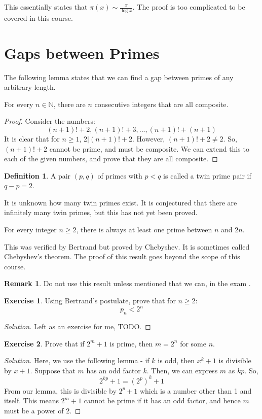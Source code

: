 \documentclass[12pt,letterpaper]{amsbook}
\theoremstyle{definition}
\newtheorem{definition}{Definition} %
\newtheorem*{remark}{Remark}
\newtheorem*{exercise}{Exercise}
\newenvironment{solution}
  {\renewcommand\qedsymbol{$\blacksquare$}\begin{proof}[Solution]}
  {\end{proof}}
\newcommand{\N}{\mathbb{N}}
\begin{document}
This essentially states that $\pi (x) \sim \frac{x}{\log{x}}$. The proof is too complicated to be covered in this course.

\section{Gaps between Primes}

The following lemma states that we can find a gap between primes of any arbitrary length.

\begin{lemma}
  For every $n \in \N$, there are $n$ consecutive integers that are all composite.  
\end{lemma}

\begin{proof}
  Consider the numbers:
  \[(n+1)! + 2, (n+1)! + 3, ... ,(n+1)!+(n+1)\]
  It is clear that for $n \geq 1$, $2|(n+1)!+2$. However, $(n+1)! + 2 \neq 2$. So, $(n+1)!+2$ cannot be prime, and must be composite. We can extend this to each of the given numbers, and prove that they are all composite.
\end{proof}

\begin{definition}
  A pair $(p,q)$ of primes with $p < q$ is called a twin prime pair if $q-p = 2$.  
\end{definition}

It is unknown how many twin primes exist. It is conjectured that there are infinitely many twin primes, but this has not yet been proved.

\begin{theorem}
  For every integer $n \geq 2$, there is always at least one prime between $n$ and $2n$.  
\end{theorem}

This was verified by Bertrand but proved by Chebyshev. It is sometimes called Chebyshev's theorem. The proof of this result goes beyond the scope of this course.

\begin{remark}
  Do not use this result unless mentioned that we can, in the exam .
\end{remark}

\begin{exercise}
  Using Bertrand's postulate, prove that for $n \geq 2$:
  \[p_n < 2^n\]
\end{exercise}

\begin{solution}
  Left as an exercise for me, TODO.
\end{solution}
\begin{exercise}
  Prove that if $2^{m}+1$ is prime, then $m = 2^n$ for some $n$.
\end{exercise}
\begin{solution}
  Here, we use the following lemma - if $k$ is odd, then $x^k+1$ is divisible by $x+1$.
  Suppose that $m$ has an odd factor $k$. Then, we can express $m$ as $kp$. So,
  \[2^{kp}+1 = (2^{p})^k + 1\]
  From our lemma, this is divisible by $2^p+1$ which is a number other than 1 and itself. This means $2^m+1$ cannot be prime if it has an odd factor, and hence $m$ must be a power of 2.
\end{solution}
\end{document}
